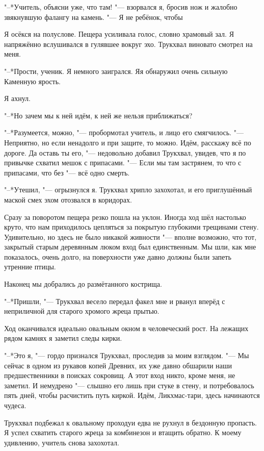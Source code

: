 "--*Учитель, объясни уже, что там! "--- взорвался я, бросив нож и жалобно звякнувшую фалангу на камень.
"--- Я не ребёнок, чтобы\ldotst

Я осёкся на полуслове.
Пещера усиливала голос, словно храмовый зал.
Я напряжённо вслушивался в гулявшее вокруг эхо.
Трукхвал виновато смотрел на меня.

"--*Прости, ученик.
Я немного заигрался.
Я\ldotst я обнаружил очень сильную Каменную ярость.

Я ахнул.

"--*Но зачем мы к ней идём, к ней же нельзя приближаться?

"--*Разумеется, можно, "--- пробормотал учитель, и лицо его смягчилось.
"--- Неприятно, но если ненадолго и при защите, то можно.
Идём, расскажу всё по дороге.
Да оставь ты его, "--- недовольно добавил Трукхвал, увидев, что я по привычке схватил мешок с припасами.
"--- Если мы там застрянем, то что с припасами, что без "--- всё одно смерть.

"--*Утешил, "--- огрызнулся я.
Трукхвал хрипло захохотал, и его приглушённый маской смех эхом отозвался в коридорах.

\razd

Сразу за поворотом пещера резко пошла на уклон.
Иногда ход шёл настолько круто, что нам приходилось цепляться за покрытую глубокими трещинами стену.
Удивительно, но здесь не было никакой живности "--- вполне возможно, что тот, закрытый старым деревянным люком вход был единственным.
Мы шли, как мне показалось, очень долго, на поверхности уже давно должны были запеть утренние птицы.

Наконец мы добрались до размётанного кострища.

"--*Пришли, "--- Трукхвал весело передал факел мне и рванул вперёд с неприличной для старого хромого жреца прытью.

Ход оканчивался идеально овальным окном в человеческий рост.
На лежащих рядом камнях я заметил следы кирки.

"--*Это я, "--- гордо признался Трукхвал, проследив за моим взглядом.
"--- Мы сейчас в одном из рукавов копей Древних, их уже давно обшарили наши предшественники в поисках сокровищ.
А этот вход никто, кроме меня, не заметил.
И немудрено "--- слышно его лишь при стуке в стену, и потребовалось пять дней, чтобы расчистить путь киркой.
Идём, Ликхмас-тари, здесь начинаются чудеса.

Трукхвал подбежал к овальному проходу\ldotst и едва не рухнул в бездонную пропасть.
Я успел схватить старого жреца за комбинезон и втащить обратно.
К моему удивлению, учитель снова захохотал.

